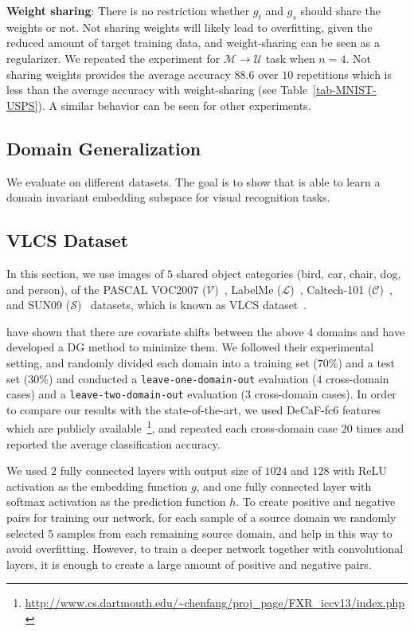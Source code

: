 \noindent \textbf{Weight sharing}: There is no restriction whether $g_t$ and $g_s$ should share the weights or not. Not sharing weights will likely lead to overfitting, given the reduced amount of target training data, and weight-sharing can be seen as a regularizer. We repeated the experiment for $\mathcal{M} \rightarrow \mathcal{U}$ task when $n=4$. Not sharing weights provides the average accuracy $88.6$ over $10$ repetitions  which is less than the average accuracy with weight-sharing (see Table~\ref{tab-MNIST-USPS}). A similar behavior can be seen for other experiments.

\subsection{Domain Generalization}

We evaluate \modelGA on different datasets. The goal is to show that \modelGA is able to learn a domain invariant embedding subspace for visual recognition tasks.

\subsection{VLCS Dataset}
In this section, we use images of $5$ shared object categories (bird, car, chair, dog, and person), of the PASCAL VOC2007 ($\mathcal{V}$)~\cite{everingham2010pascal}, LabelMe ($\mathcal{L}$)~\cite{russell2008labelme},
Caltech-101 ($\mathcal{C}$)~\cite{fei2007learning}, and SUN09 ($\mathcal{S}$)~\cite{choi2010exploiting} datasets, which is known as VLCS dataset~\cite{FXRQ_iccv13}.

\cite{ghifary2015domain,ghifary2016scatter} have shown that there are covariate shifts between the above $4$ domains and have developed a DG method to minimize them. We followed their experimental setting, and randomly divided each domain into a training set ($70\%$) and a test set ($30\%$) and conducted a {\tt leave-one-domain-out} evaluation ($4$ cross-domain cases) and a {\tt leave-two-domain-out} evaluation ($3$ cross-domain cases). In order to compare our results with the state-of-the-art, we used DeCaF-fc6 features which are publicly available~\footnote{\url{http://www.cs.dartmouth.edu/~chenfang/proj_page/FXR_iccv13/index.php}}, and repeated each cross-domain case $20$ times and reported the average classification accuracy.

We used $2$ fully connected layers with output size of $1024$ and $128$ with ReLU activation as the embedding function $g$, and one fully connected layer with softmax activation as the prediction function $h$.
To create positive and negative pairs for training our network, for each sample of a source domain we randomly selected 5 samples from each remaining source domain, and help in this way to avoid overfitting. However, to train a deeper network together with convolutional layers, it is enough to create a large amount of positive and negative pairs.


